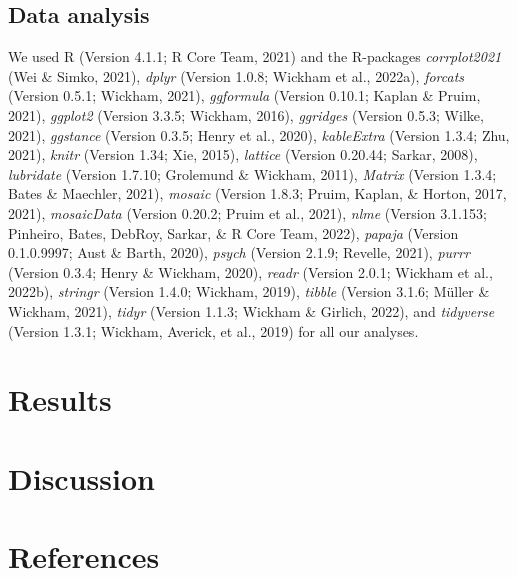 \documentclass[
  english,
  man]{apa6}
\begin{document}
\hypertarget{data-analysis}{%
\subsection{Data analysis}\label{data-analysis}}

We used R (Version 4.1.1; R Core Team, 2021) and the R-packages \emph{corrplot2021} (Wei \& Simko, 2021), \emph{dplyr} (Version 1.0.8; Wickham et al., 2022a), \emph{forcats} (Version 0.5.1; Wickham, 2021), \emph{ggformula} (Version 0.10.1; Kaplan \& Pruim, 2021), \emph{ggplot2} (Version 3.3.5; Wickham, 2016), \emph{ggridges} (Version 0.5.3; Wilke, 2021), \emph{ggstance} (Version 0.3.5; Henry et al., 2020), \emph{kableExtra} (Version 1.3.4; Zhu, 2021), \emph{knitr} (Version 1.34; Xie, 2015), \emph{lattice} (Version 0.20.44; Sarkar, 2008), \emph{lubridate} (Version 1.7.10; Grolemund \& Wickham, 2011), \emph{Matrix} (Version 1.3.4; Bates \& Maechler, 2021), \emph{mosaic} (Version 1.8.3; Pruim, Kaplan, \& Horton, 2017, 2021), \emph{mosaicData} (Version 0.20.2; Pruim et al., 2021), \emph{nlme} (Version 3.1.153; Pinheiro, Bates, DebRoy, Sarkar, \& R Core Team, 2022), \emph{papaja} (Version 0.1.0.9997; Aust \& Barth, 2020), \emph{psych} (Version 2.1.9; Revelle, 2021), \emph{purrr} (Version 0.3.4; Henry \& Wickham, 2020), \emph{readr} (Version 2.0.1; Wickham et al., 2022b), \emph{stringr} (Version 1.4.0; Wickham, 2019), \emph{tibble} (Version 3.1.6; Müller \& Wickham, 2021), \emph{tidyr} (Version 1.1.3; Wickham \& Girlich, 2022), and \emph{tidyverse} (Version 1.3.1; Wickham, Averick, et al., 2019) for all our analyses.

\hypertarget{results}{%
\section{Results}\label{results}}

\hypertarget{discussion}{%
\section{Discussion}\label{discussion}}

\newpage

\hypertarget{references}{%
\section{References}\label{references}}

\begingroup
\setlength{\parindent}{-0.5in}
\setlength{\leftskip}{0.5in}
\end{document}
